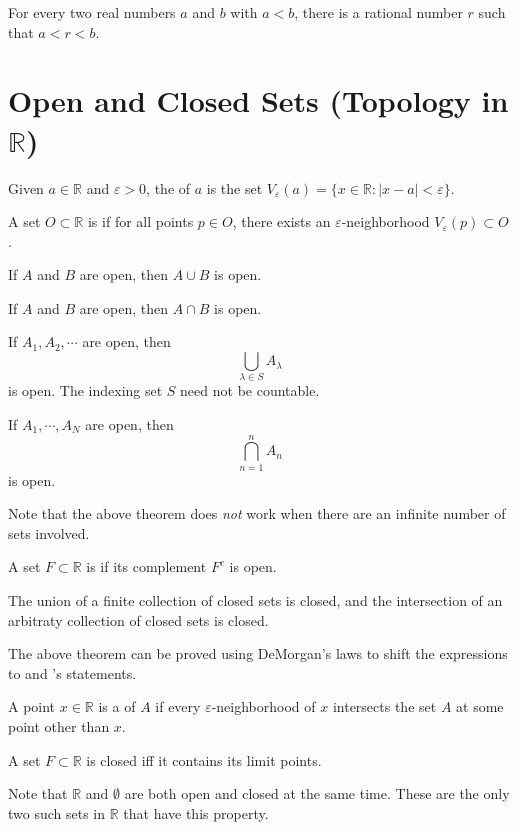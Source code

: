 \begin{theorem}
For every two real numbers $a$ and $b$ with $a<b$, there is a rational number $r$ such that $a<r<b$. 
\end{theorem}

\newpage

\section{Open and Closed Sets (Topology in $\mathbb{R}$)} 
\begin{definition}
Given $a \in \mathbb{R}$ and $\varepsilon > 0$, the  of $a$ is the set $V_\varepsilon(a) = \{x \in \mathbb{R} : |x-a| < \varepsilon\}$. 
\end{definition}
\begin{definition}
A set $O \subset \mathbb{R}$ is  if for all points $p \in O$, there exists an $\varepsilon$-neighborhood $V_\varepsilon (p) \subset O$. 
\end{definition}
\begin{proposition}
If $A$ and $B$ are open, then $A \cup B$ is open. 
\end{proposition}
\begin{proposition}
If $A$ and $B$ are open, then $A \cap B$ is open. 
\end{proposition}
\begin{theorem}
If $A_1, A_2, \cdots$ are open, then $$ \bigcup_{\lambda \in S} A_\lambda $$ is open. The indexing set $S$ need not be countable. 
\end{theorem}
\begin{theorem}
If $A_1, \cdots, A_N$ are open, then 
$$ \bigcap_{n=1}^n A_n$$ is open.
\end{theorem}
Note that the above theorem does \emph{not} work when there are an infinite number of sets involved. 
\begin{definition}
A set $F\subset \mathbb{R}$ is  if its complement $F^c$ is open. 
\end{definition}
\begin{theorem}
The union of a finite collection of closed sets is closed, and the intersection of an arbitraty collection of closed sets is closed.
\end{theorem}
The above theorem can be proved using DeMorgan's laws to shift the expressions to  and 's statements.
\begin{definition}
A point $x \in \mathbb{R}$ is a  of $A$ if every $\varepsilon$-neighborhood of $x$ intersects the set $A$ at some point other than $x$. 
\end{definition}
\begin{theorem}
A set $F \subset \mathbb{R}$ is closed iff it contains its limit points. 
\end{theorem}
\begin{remark*}
Note that $\mathbb{R}$ and $\emptyset$ are both open and closed at the same time. These are the only two such sets in $\mathbb{R}$ that have this property. 
\end{remark*}
